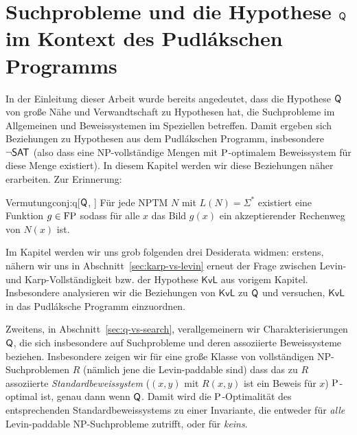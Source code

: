 \chapter{Suchprobleme und die Hypothese $\hQ$ im Kontext des Pudlákschen Programms}\label{chap:pudlak}


In der Einleitung dieser Arbeit wurde bereits angedeutet, dass die Hypothese $\hQ$ von \citeauthor{fenner_inverting_2003} große Nähe und Verwandtschaft zu Hypothesen hat, die Suchprobleme im Allgemeinen und Beweissystemen im Speziellen betreffen. Damit ergeben sich Beziehungen zu Hypothesen aus dem Pudlákschen Programm, insbesondere $\neg\hSAT$ (also dass eine NP-vollständige Mengen mit $\P$-optimalem Beweissystem für diese Menge existiert).
In diesem Kapitel werden wir diese Beziehungen näher erarbeiten. Zur Erinnerung:

\begin{reptheorem}{Vermutung}{conj:q}[$\hQ$, \cite{fenner_inverting_2003}]
    Für jede NPTM $N$ mit $L(N)=\Sigma^*$ existiert eine Funktion $g\in\FP$ sodass für alle $x$ das Bild $g(x)$ ein akzeptierender Rechenweg von $N(x)$ ist. 
\end{reptheorem}

Im Kapitel werden wir uns grob folgenden drei Desiderata widmen: 
erstens, nähern wir uns in Abschnitt~\ref{sec:karp-vs-levin} erneut der Frage zwischen Levin- und Karp-Vollständigkeit bzw. der Hypothese $\mathsf{KvL}$ aus vorigem Kapitel. Insbesondere analysieren wir die Beziehungen von $\mathsf{KvL}$ zu $\hQ$ und versuchen, $\mathsf{KvL}$ in das Pudláksche Programm einzuordnen.

Zweitens, in Abschnitt~\ref{sec:q-vs-search}, verallgemeinern wir Charakterisierungen $\hQ$, die sich insbesondere auf Suchprobleme und deren assoziierte Beweissysteme beziehen.
Insbesondere zeigen wir für eine große Klasse von vollständigen NP-Suchproblemen $R$ (nämlich jene die Levin-paddable sind) dass das zu $R$ assoziierte \emph{Standardbeweissystem} ($(x,y)$ mit $R(x,y)$ ist ein Beweis für $x$) $\P$-optimal ist, genau dann wenn $\hQ$. Damit wird die $\P$-Optimalität des entsprechenden Standardbeweissystems zu einer Invariante, die entweder für \emph{alle} Levin-paddable NP-Suchprobleme zutrifft, oder für \emph{keins}.


